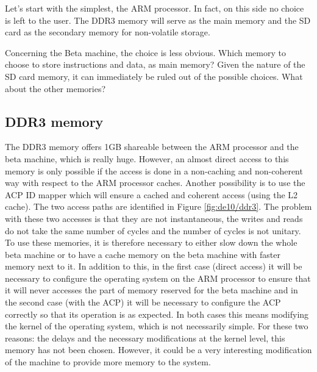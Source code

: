 Let's start with the simplest, the ARM processor. In fact, on this side no choice is left to the 
user. The DDR3 memory will serve as the main memory and the SD card as the secondary memory for 
non-volatile storage. 

Concerning the Beta machine, the choice is less obvious.  Which memory to choose to store 
instructions and data, as main memory?  Given the nature of the SD card memory, it can immediately be 
ruled out of the possible choices. What about the other memories?

\subsection{DDR3 memory}

The DDR3 memory offers 1GB 
shareable between the ARM processor and the beta machine,
which is really huge. However, an almost 
direct access to this memory is only possible if the access is done in a non-caching and 
non-coherent way with respect to the ARM processor caches. Another possibility is to use the ACP 
ID mapper which will ensure a cached and coherent access (using the L2 cache). The two access paths 
are identified in Figure \ref{fig:de10/ddr3}. The problem with these two accesses is that they are 
not instantaneous, the writes and reads do not take the same number of cycles and the number of 
cycles is not unitary. To use these memories, it is therefore necessary to either slow down the 
whole beta machine or to have a cache memory on the beta machine with faster memory next to it. In 
addition to this, in the first case (direct access) it will be necessary to configure the operating 
system on the ARM processor to ensure that it will never accesses the part of memory reserved for the
beta machine and in the second case (with the ACP) it will be necessary to configure the ACP 
correctly so that its operation is as expected. In both cases this means modifying the kernel of the 
operating system, which is not necessarily simple. For these two reasons: the delays and the 
necessary modifications at the kernel level, this memory has not been chosen. However, it could be 
a very interesting modification of the machine to provide more memory to the system.

